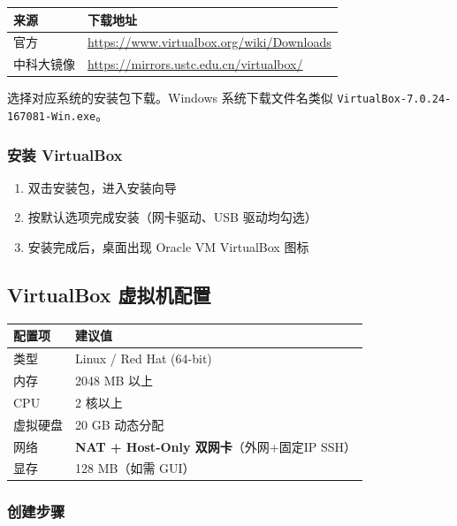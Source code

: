 \documentclass[12pt,a4paper]{ctexart}
\begin{document}
\begin{table}[h]
\centering
\begin{tabular}{p{3cm}p{10cm}}
\toprule
来源       & 下载地址 \\
\midrule
官方       & \url{https://www.virtualbox.org/wiki/Downloads} \\
中科大镜像  & \url{https://mirrors.ustc.edu.cn/virtualbox/} \\
\bottomrule
\end{tabular}
\end{table}

选择对应系统的安装包下载。Windows 系统下载文件名类似 \texttt{VirtualBox-7.0.24-167081-Win.exe}。

\subsubsection{安装 VirtualBox}

\begin{enumerate}[label=\arabic*.,leftmargin=*]
  \item 双击安装包，进入安装向导
  \item 按默认选项完成安装（网卡驱动、USB 驱动均勾选）
  \item 安装完成后，桌面出现 Oracle VM VirtualBox 图标
\end{enumerate}

\subsection{VirtualBox 虚拟机配置}

\begin{table}[h]
\centering
\begin{tabular}{ll}
\toprule
配置项  & 建议值 \\
\midrule
类型    & Linux / Red Hat (64-bit) \\
内存    & 2048 MB 以上 \\
CPU     & 2 核以上 \\
虚拟硬盘 & 20 GB 动态分配 \\
网络    & \textbf{NAT + Host-Only 双网卡}（外网+固定IP SSH） \\
显存    & 128 MB（如需 GUI） \\
\bottomrule
\end{tabular}
\end{table}

\subsubsection{创建步骤}
\end{document}
